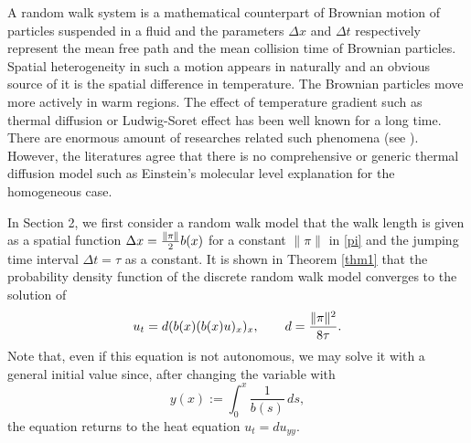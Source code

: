 \documentclass[11pt]{amsart}
\begin{document}
A random walk system is a mathematical counterpart of Brownian motion of particles suspended in a fluid and the parameters $\Delta x$ and $\Delta t$ respectively represent the mean free path and the mean collision time of Brownian particles. Spatial heterogeneity in such a motion appears in naturally and an obvious source of it is the spatial difference in temperature. The Brownian particles move more actively in warm regions. The effect of temperature gradient such as thermal diffusion or Ludwig-Soret effect  \cite{Ludwig1856,Soret1879} has been well known for a long time. There are enormous amount of researches related such phenomena (see \cite{Braun2004, Duhr2006, Eslamian2009, Harstad2009, Huang2010,14,Putnam2007,Srinivasan2011}). However, the literatures agree that there is no comprehensive or generic thermal diffusion model such as Einstein's molecular level explanation for the homogeneous case.

In Section 2, we first consider a random walk model that the walk length is given as a spatial function $\Delta x={\|\pi\|\over2}b(x)$ for a constant $\|\pi\|$ in \eqref{pi} and the jumping time interval $\Delta t=\tau$ as a constant. It is shown in Theorem \ref{thm1} that the probability density function of the discrete random walk model converges to the solution of
$$
u_t=d(b(x)(b(x)u)_x)_x,\qquad d={\|\pi\|^2\over 8\tau}.
$$
Note that, even if this equation is not autonomous, we may solve it with a general initial value since, after changing the variable with
$$
y(x):=\int_0^x \frac{1}{b(s)}\,ds,
$$
the equation returns to the heat equation $u_t=du_{yy}$.
\end{document}
